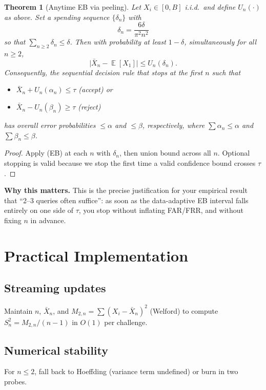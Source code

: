 \documentclass[11pt]{article}
\newtheorem{theorem}{Theorem}
\DeclareMathOperator{\E}{\mathbb{E}}
\begin{document}
\begin{theorem}[Anytime EB via peeling]
\label{thm:anytime}
Let $X_i\in[0,B]$ i.i.d.\ and define $U_n(\cdot)$ as above. Set a spending sequence $\{\delta_n\}$ with 
\begin{equation}
\delta_n = \frac{6\delta}{\pi^2 n^2}
\end{equation}
so that $\sum_{n\ge 2}\delta_n\le \delta$. Then with probability at least $1-\delta$, simultaneously for all $n\ge 2$,
\begin{equation}
\bigl|\bar{X}_n - \E[X_1]\bigr| \le U_n(\delta_n).
\end{equation}
Consequently, the sequential decision rule that stops at the first $n$ such that
\begin{itemize}
\item $\bar{X}_n + U_n(\alpha_n) \le \tau$ (accept) or 
\item $\bar{X}_n - U_n(\beta_n) \ge \tau$ (reject)
\end{itemize}
has overall error probabilities $\le \alpha$ and $\le \beta$, respectively, where $\sum \alpha_n\le \alpha$ and $\sum \beta_n\le \beta$.
\end{theorem}

\begin{proof}
Apply (EB) at each $n$ with $\delta_n$, then union bound across all $n$. Optional stopping is valid because we stop the first time a valid confidence bound crosses $\tau$.
\end{proof}

\textbf{Why this matters.} This is the precise justification for your empirical result that ``2–3 queries often suffice'': as soon as the data-adaptive EB interval falls entirely on one side of $\tau$, you stop without inflating FAR/FRR, and without fixing $n$ in advance.

\section{Practical Implementation}

\subsection{Streaming updates}
Maintain $n$, $\bar{X}_n$, and $M_{2,n}=\sum (X_i-\bar{X}_n)^2$ (Welford) to compute $S_n^2=M_{2,n}/(n-1)$ in $O(1)$ per challenge.

\subsection{Numerical stability}
For $n\le 2$, fall back to Hoeffding (variance term undefined) or burn in two probes.
\end{document}
